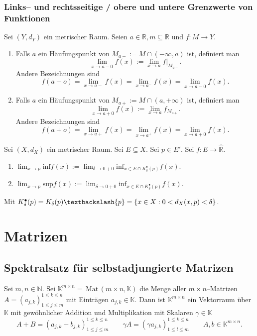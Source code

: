 \documentclass[a4paper,12pt]{article}
\begin{document}
\subsubsection{Links-- und rechtsseitige / obere und untere Grenzwerte von Funktionen}
Sei $(Y,d_Y)$ ein metrischer Raum. Seien $a \in \mathbb{R},m\subseteq \mathbb{R}$ und $f:M\rightarrow Y$.
\begin{enumerate}[label=\arabic*.]
        \item Falls $a$ ein Häufungspunkt von $M_{a-}:=M\cap (-\infty,a)$ ist, definiert man \[
                        \lim_{x\rightarrow a-0}f(x):=\lim_{x\rightarrow a}f|_{M_{a-}}
                .\]
                Andere Bezeichnungen sind
                \[ 
                        f(a-o)=\lim_{x\rightarrow a-}f(x)=\lim_{x\rightarrow a^-}f(x)=\lim_{x\rightarrow a-0}f(x)
                .\] 
        \item Falls $a$ ein Häufungspunkt von $M_{a+}:=M\cap (a,+\infty)$ ist, definiert man 
                \[
                        \lim_{x\rightarrow a+0}f(x):=\lim_{x\rightarrow a}f_{M_{a+}}
                .\]
                Andere Bezeichnungen sind
                \[ 
                       f(a+o)=\lim_{x\rightarrow a+}f(x)=\lim_{x\rightarrow a^+}f(x)=\lim_{x\rightarrow a+0}f(x)
                .\] 
\end{enumerate}
Sei $(X,d_X)$ ein metrischer Raum. Sei $E\subseteq X$. Sei $p \in E'$. Sei $f:E\rightarrow \hat{\mathbb{R}}$.
\begin{enumerate}[label=\arabic*.]
        \item $\lim_{x\rightarrow p}\text{inf}f(x):=\lim_{\delta \rightarrow 0+0}\text{inf}_{x \in E\cap K_\delta ^\bullet (p)}f(x)$.
        \item $\lim_{x\rightarrow p}\text{sup}f(x):=\lim_{\delta \rightarrow 0+0}\text{inf}_{x \in E\cap K_\delta ^\bullet (p)}f(x)$.
\end{enumerate}
Mit $K_\delta ^\bullet(p)=K_\delta (p)\textbackslash \{p\}=\left\{x \in X:0<d_X(x,p)<\delta \right\}$.

\section{Matrizen}
\subsection{Spektralsatz für selbstadjungierte Matrizen}
Sei $m,n  \in \mathbb{N}$. Sei $\mathbb{K}^{m\times n}=\,\text{Mat}\,\left(m\times n,\mathbb{K}\right)$ die Menge aller $m\times n$--Matrizen $A=\left(a_{j,k}\right)_{1\leq j\leq m}^{1\leq k\leq n}$ mit Einträgen $a_{j,k} \in \mathbb{K}$. Dann ist $\mathbb{K}^{m\times n}$ ein Vektorraum über $\mathbb{K}$ mit gewöhnlicher Addition und Multiplikation mit Skalaren $\gamma  \in \mathbb{K}$ 
\[ 
        A+B=\left(a_{j,k}+b_{j,k}\right)_{1\leq j\leq m}^{1\leq k\leq n}\qquad \gamma A=\left(\gamma a_{j,k}\right)_{1\leq l\leq m}^{1\leq k\leq n}\qquad A,b \in \mathbb{K}^{m\times n}
.\] 
\end{document}
